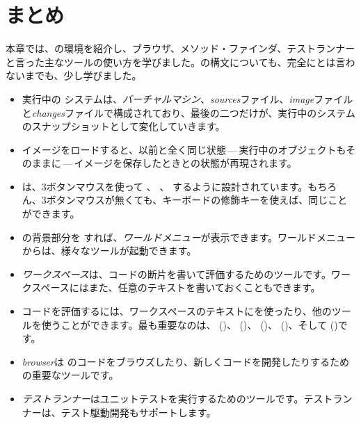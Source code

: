 \documentclass[a4paper,10pt,twoside]{book}
\begin{document}
\section{まとめ}
本章では、\pharo の環境を紹介し、ブラウザ、メソッド・ファインダ、テストランナーと言った主なツールの使い方を学びました。\pharo の構文についても、完全にとは言わないまでも、少し学びました。

\begin{itemize}
  \item 実行中の \pharo システムは、\emph{バーチャルマシン}、\emph{sources}ファイル、\emph{image}ファイルと\emph{changes}ファイルで構成されており、最後の二つだけが、実行中のシステムのスナップショットとして変化していきます。
  \item \pharo イメージをロードすると、以前と全く同じ状態\,---\,実行中のオブジェクトもそのままに\,---\,イメージを保存したときとの状態が再現されます。
  \item \pharo は、3ボタンマウスを使って \click、 \actclick、 \metaclick するように設計されています。もちろん、3ボタンマウスが無くても、キーボードの修飾キーを使えば、同じことができます。
  \item \pharo の背景部分を \click すれば、\emph{ワールドメニュー}が表示できます。ワールドメニューからは、様々なツールが起動できます。
  \item \emph{ワークスペース}は、コードの断片を書いて評価するためのツールです。ワークスペースにはまた、任意のテキストを書いておくこともできます。
  \item コードを評価するには、ワークスペースのテキストにを使ったり、他のツールを使うことができます。最も重要なのは、 ()、 ()、 ()、 ()、そして ()です。
  \item \emph{browser}は \pharo のコードをブラウズしたり、新しくコードを開発したりするための重要なツールです。
  \item \emph{テストランナー}はユニットテストを実行するためのツールです。テストランナーは、テスト駆動開発もサポートします。
\end{itemize}

\ifx\wholebook\relax\else 
   
   
\end{document}
